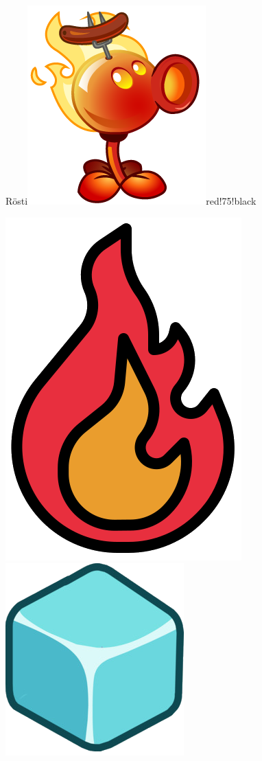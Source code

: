 \documentclass[11pt, a5paper]{article}
\def\now{\hspace{0.2cm}}
\begin{document}
\begin{mybox}{Rösti}{\includegraphics[scale=0.1]{fire}}{red!75!black}
\begin{minipage}[t]{\textwidth}
			\now\includegraphics[scale=0.075]{firef} 
			\now\includegraphics[scale=0.3]{icei} 
		\end{minipage}
	\end{mybox}
	\vspace{0.5cm}
\end{document}
